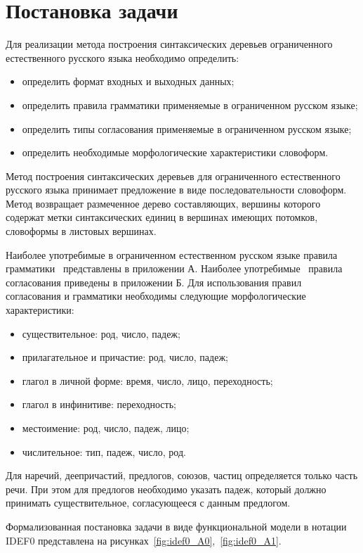 \section{Постановка задачи}

Для реализации метода построения синтаксических деревьев ограниченного естественного русского языка необходимо определить:
\begin{itemize}
	\item определить формат входных и выходных данных;
	\item определить правила грамматики применяемые в ограниченном русском языке;
	\item определить типы согласования применяемые в ограниченном русском языке;
	\item определить необходимые морфологические характеристики словоформ.
\end{itemize}

Метод построения синтаксических деревьев для ограниченного естественного русского языка принимает предложение в виде последовательности словоформ. Метод возвращает размеченное дерево составляющих, вершины которого содержат метки синтаксических единиц в вершинах имеющих потомков, словоформы в листовых вершинах.

Наиболее употребимые в ограниченном естественном русском языке правила грамматики~\cite{syntagrus_syntax_annotation,Testelets2001} представлены в приложении А. Наиболее употребимые~\cite{syntagrus_syntax_annotation,Testelets2001} правила согласования приведены в приложении Б. Для использования правил согласования и грамматики необходимы следующие морфологические характеристики:
\begin{itemize}
	\item существительное: род, число, падеж;
	\item прилагательное и причастие: род, число, падеж;
	\item глагол в личной форме: время, число, лицо, переходность;
	\item глагол в инфинитиве: переходность;
	\item местоимение: род, число, падеж, лицо;
	\item числительное: тип, падеж, число, род.
\end{itemize}
Для наречий, деепричастий, предлогов, союзов, частиц определяется только часть речи. При этом для предлогов необходимо указать падеж, который должно принимать существительное, согласующееся с данным предлогом.

Формализованная постановка задачи в виде функциональной модели в нотации IDEF0 представлена на рисунках~\ref{fig:idef0_A0},~\ref{fig:idef0_A1}.

